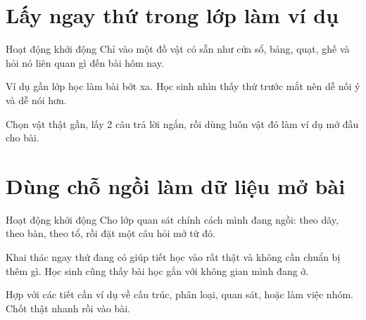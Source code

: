 \section{Lấy ngay thứ trong lớp làm ví dụ}
\begin{khoidongbox}{Hoạt động khởi động}
Chỉ vào một đồ vật có sẵn như cửa sổ, bảng, quạt, ghế và hỏi nó liên quan gì đến bài hôm nay.
\end{khoidongbox}
\begin{visaohieuqua}
Ví dụ gần lớp học làm bài bớt xa. Học sinh nhìn thấy thứ trước mắt nên dễ nối ý và dễ nói hơn.
\end{visaohieuqua}
\begin{cachlam5phut}
Chọn vật thật gần, lấy 2 câu trả lời ngắn, rồi dùng luôn vật đó làm ví dụ mở đầu cho bài.
\end{cachlam5phut}
\ngancach

\section{Dùng chỗ ngồi làm dữ liệu mở bài}
\begin{khoidongbox}{Hoạt động khởi động}
Cho lớp quan sát chính cách mình đang ngồi: theo dãy, theo bàn, theo tổ, rồi đặt một câu hỏi mở từ đó.
\end{khoidongbox}
\begin{visaohieuqua}
Khai thác ngay thứ đang có giúp tiết học vào rất thật và không cần chuẩn bị thêm gì. Học sinh cũng thấy bài học gắn với không gian mình đang ở.
\end{visaohieuqua}
\begin{cachlam5phut}
Hợp với các tiết cần ví dụ về cấu trúc, phân loại, quan sát, hoặc làm việc nhóm. Chốt thật nhanh rồi vào bài.
\end{cachlam5phut}
